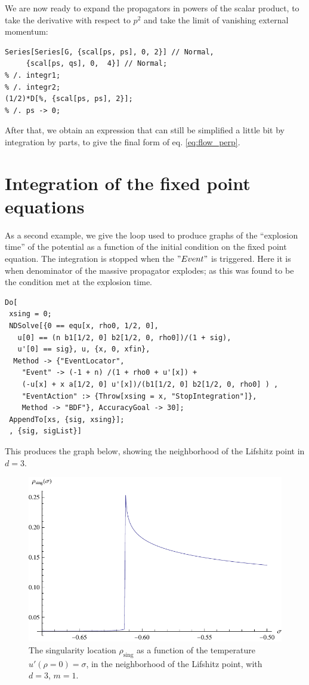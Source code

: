 We are now ready to expand the propagators in powers of the scalar product, to take the derivative with respect to $p^2$ and take the limit of vanishing external momentum:
\begin{lstlisting}
Series[Series[G, {scal[ps, ps], 0, 2}] // Normal,
	 {scal[ps, qs], 0,  4}] // Normal;
% /. integr1;
% /. integr2;
(1/2)*D[%, {scal[ps, ps], 2}];
% /. ps -> 0;
\end{lstlisting}

After that, we obtain an expression that can still be simplified a little bit by integration by parts, to give the final form of eq. \eqref{eq:flow_perp}.

\section{Integration of the fixed point equations}

As a second example, we give the loop used to produce graphs of the ``explosion time'' of the potential as a function of the initial condition on the fixed point equation.
The integration is stopped when the $"Event"$ is triggered. Here it is when denominator of the massive propagator explodes; as this was found to be the condition met at the explosion time.
\begin{lstlisting}
Do[
 xsing = 0;
 NDSolve[{0 == equ[x, rho0, 1/2, 0], 
   u[0] == (n b1[1/2, 0] b2[1/2, 0, rho0])/(1 + sig), 
   u'[0] == sig}, u, {x, 0, xfin}, 
  Method -> {"EventLocator", 
    "Event" -> (-1 + n) /(1 + rho0 + u'[x]) + 
    (-u[x] + x a[1/2, 0] u'[x])/(b1[1/2, 0] b2[1/2, 0, rho0] ) , 
    "EventAction" :> {Throw[xsing = x, "StopIntegration"]}, 
    Method -> "BDF"}, AccuracyGoal -> 30];
 AppendTo[xs, {sig, xsing}];
 , {sig, sigList}]
 \end{lstlisting}

This produces the graph below, showing the neighborhood of the Lifshitz point in $d=3$.
\begin{figure}[htp]
\begin{center}
\includegraphics[scale=0.75]{img/app_mathematica/result.pdf}
\caption{The singularity location $\rho_{\text{sing}}$ as a function of the temperature $u'(\rho=0) = \sigma$, in the neighborhood of the Lifshitz point, with $d=3$, $m=1$.}
\label{}
\end{center}
\end{figure}